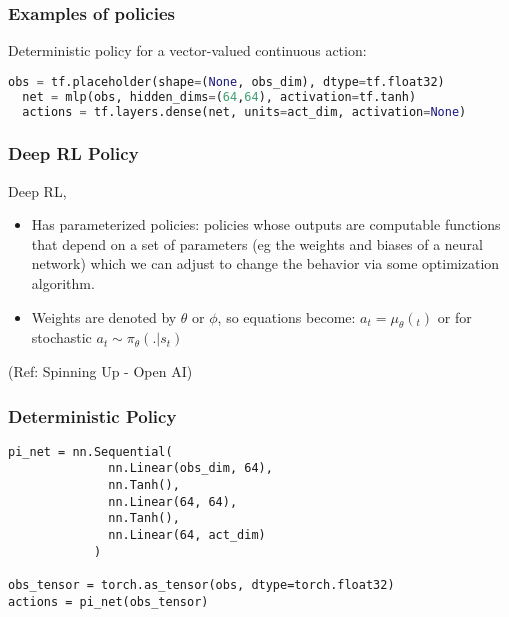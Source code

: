 \begin{frame}[fragile]\frametitle{Examples of policies}

Deterministic policy for a vector-valued continuous action:

\begin{lstlisting}[language=python]
  obs = tf.placeholder(shape=(None, obs_dim), dtype=tf.float32)
  net = mlp(obs, hidden_dims=(64,64), activation=tf.tanh)
  actions = tf.layers.dense(net, units=act_dim, activation=None)
\end{lstlisting}




\end{frame}

\begin{frame}[fragile]\frametitle{Deep RL Policy}

Deep RL, 
\begin{itemize}

\item Has parameterized policies: policies whose outputs are computable functions that depend on a set of parameters (eg the weights and biases of a neural network) which we can adjust to change the behavior via some optimization algorithm.
\item Weights are denoted by $\theta$ or $\phi$, so equations become: $a_t=\mu_\theta(_t)$ or for stochastic $a_t \sim \pi_\theta(.|s_t)$
\end{itemize}

{\tiny (Ref: Spinning Up - Open AI)}


\end{frame}

\begin{frame}[fragile]\frametitle{Deterministic Policy}

\begin{lstlisting}
pi_net = nn.Sequential(
              nn.Linear(obs_dim, 64),
              nn.Tanh(),
              nn.Linear(64, 64),
              nn.Tanh(),
              nn.Linear(64, act_dim)
            )
						
obs_tensor = torch.as_tensor(obs, dtype=torch.float32)
actions = pi_net(obs_tensor)
\end{lstlisting}

\end{frame}

